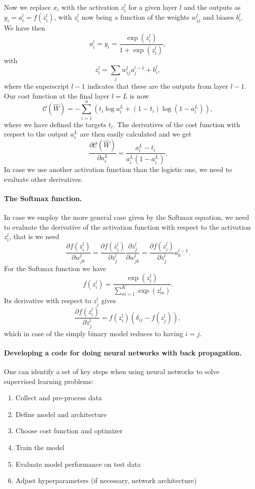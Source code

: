 Now we replace $x_i$ with the activation $z_i^l$ for a given layer $l$ and the outputs as $y_i=a_i^l=f(z_i^l)$, with $z_i^l$ now being a function of the weights $w_{ij}^l$ and biases $b_i^l$. 
We have then
\[
a_i^l = y_i = \frac{\exp{(z_i^l)}}{1+\exp{(z_i^l)}},
\]
with 
\[
z_i^l = \sum_{j}w_{ij}^l a_j^{l-1}+b_i^l,
\]
where the superscript $l-1$ indicates that these are the outputs from layer $l-1$.
Our cost function at the final layer $l=L$ is now
\[
\mathcal{C}(\hat{W}) = - \sum_{i=1}^n \left(t_i\log{a_i^L}+(1-t_i)\log{(1-a_i^L)}\right),
\]
where we have defined the targets $t_i$. The derivatives of the cost function with respect to the output $a_i^L$ are then easily calculated and we get
\[
\frac{\partial \mathcal{C}(\hat{W})}{\partial a_i^L} = \frac{a_i^L-t_i}{a_i^L(1-a_i^L)}. 
\]
In case we use another activation function than the logistic one, we need to evaluate other derivatives. 

\paragraph{The Softmax function.}
In case we employ the more general case given by the Softmax equation, we need to evaluate the derivative of the activation function with respect to the activation $z_i^l$, that is we need
\[
\frac{\partial f(z_i^l)}{\partial w_{jk}^l} =
\frac{\partial f(z_i^l)}{\partial z_j^l} \frac{\partial z_j^l}{\partial w_{jk}^l}= \frac{\partial f(z_i^l)}{\partial z_j^l}a_k^{l-1}.
\]
For the Softmax function we have
\[
f(z_i^l) = \frac{\exp{(z_i^l)}}{\sum_{m=1}^K\exp{(z_m^l)}}.
\]
Its derivative with respect to $z_j^l$ gives 
\[
\frac{\partial f(z_i^l)}{\partial z_j^l}= f(z_i^l)\left(\delta_{ij}-f(z_j^l)\right), 
\]
which in case of the simply binary model reduces to  having $i=j$. 

\paragraph{Developing a code for doing neural networks with back propagation.}
One can identify a set of key steps when using neural networks to solve supervised learning problems:  

\begin{enumerate}
\item Collect and pre-process data  

\item Define model and architecture  

\item Choose cost function and optimizer  

\item Train the model  

\item Evaluate model performance on test data  

\item Adjust hyperparameters (if necessary, network architecture)
\end{enumerate}

